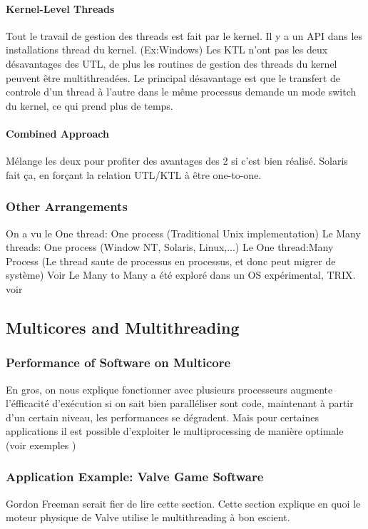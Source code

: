 \paragraph{Kernel-Level Threads}
Tout le travail de gestion des threads est fait par le kernel. Il y a un API dans les installations thread du kernel. (Ex:Windows)
Les KTL n'ont pas les deux désavantages des UTL, de plus les routines de gestion des threads du kernel peuvent être multithreadées. Le principal désavantage est que le transfert de controle d'un thread à l'autre dans le même processus demande un mode switch du kernel, ce qui prend plus de temps.
\paragraph{Combined Approach}
Mélange les deux pour profiter des avantages des 2 si c'est bien réalisé. Solaris fait ça, en forçant la relation UTL/KTL à être one-to-one.

\subsubsection{Other Arrangements}
On a vu le One thread: One process (Traditional Unix implementation)
Le Many threads: One process (Window NT, Solaris, Linux,...)
Le One thread:Many Process (Le thread saute de processus en processus, et donc peut migrer de système) Voir \cite[p.~189]{stallings} Le Many to Many a été exploré dans un OS expérimental, TRIX. voir \cite[p.~188]{stallings}

\subsection{Multicores and Multithreading}
\subsubsection{Performance of Software on Multicore}
En gros, on nous explique fonctionner avec plusieurs processeurs augmente l'éfficacité d'exécution si on sait bien paralléliser sont code, maintenant à partir d'un certain niveau, les performances se dégradent. Mais pour certaines applications il est possible d'exploiter le multiprocessing de manière optimale (voir exemples \cite[p.~193]{stallings})

\subsubsection{Application Example: Valve Game Software}
Gordon Freeman serait fier de lire cette section. Cette section explique en quoi le moteur physique de Valve utilise le multithreading à bon escient.

